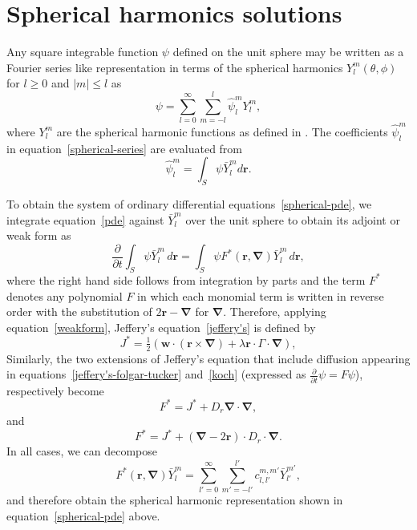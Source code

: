 \documentclass{amsart}
\newcommand\br{{\mathbf r}}
\newcommand\w{{\mathbf w}}
\newcommand\bnabla{{\boldsymbol \nabla}}
\begin{document}
\section{Spherical harmonics solutions}

Any square integrable function $\psi$ defined on the unit sphere may be written as a Fourier series like representation in terms of the spherical
harmonics $Y_l^m(\theta,\phi)$ for $l \ge 0$ and $|m| \le l$ as
\begin{equation}
\label{spherical-series}
\psi = \sum_{l=0}^\infty \sum_{m=-l}^l
\hat\psi_l^m Y_l^m ,
\end{equation}
where $Y_l^m$ are the spherical harmonic functions as defined in \cite{weisstein:06a}.
The coefficients $\hat\psi_l^m$ in equation~\eqref{spherical-series}
are evaluated from
\begin{equation}
\label{spherical-harmonic-coefficient}
\hat\psi_l^m = \int_S \psi
\bar Y_l^m d\br .
\end{equation}

To obtain the system of ordinary differential equations~\eqref{spherical-pde}, we integrate equation~\eqref{pde} against $\bar Y_l^m$ over the unit
sphere to obtain its adjoint or weak form as
\begin{equation}
\label{weakform}
\frac\partial{\partial t} \int_S \psi \bar Y_l^m
\,d\br = \int_S \psi F^*(\br,\bnabla) \bar Y_l^m \,d\br ,
\end{equation}
where the right hand side follows from integration by parts and the term $F^*$ denotes any polynomial $F$ in which each monomial term is written in
reverse order with the substitution of $2\br - \bnabla$ for $\bnabla$. Therefore, applying equation~\eqref{weakform}, Jeffery's
equation~\eqref{jeffery's} is defined by
\begin{equation}
J^* = \tfrac12(\w\cdot(\br\times\bnabla) + \lambda\br\cdot\Gamma\cdot\bnabla),
\end{equation}
Similarly, the two extensions of Jeffery's equation that include diffusion appearing in equations~\eqref{jeffery's-folgar-tucker} and~\eqref{koch}
(expressed as $\frac\partial{\partial t}\psi = F \psi$), respectively become
\begin{equation}
\label{FStarFT}
F^* = J^* + D_r \bnabla\cdot\bnabla ,
\end{equation}
and
\begin{equation}
F^* = J^* + (\bnabla-2\br)\cdot D_r\cdot\bnabla .
\end{equation}
In all cases, we can decompose
\begin{equation}
\label{decompose F}
F^*(\br,\bnabla) \bar Y_l^m = \sum_{l'=0}^\infty \sum_{m'=-l'}^{l'} c_{l,l'}^{m,m'} \bar Y_{l'}^{m'} ,
\end{equation}
and therefore obtain the spherical harmonic representation shown in equation~\eqref{spherical-pde} above.
\end{document}
